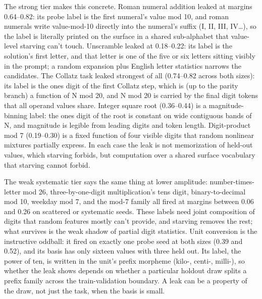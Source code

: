 The strong tier makes this concrete. Roman numeral addition leaked at
margins 0.64--0.82: its probe label is the first numeral's value mod 10,
and roman numerals write value-mod-10 directly into the numeral's suffix
(I, II, III, IV\ldots), so the label is literally printed on the surface in
a shared sub-alphabet that value-level starving can't touch. Unscramble
leaked at 0.18--0.22: its label is the solution's first letter, and that
letter is one of the five or six letters sitting visibly in the prompt;
a random expansion plus English letter statistics narrows the candidates.
The Collatz task leaked strongest of all (0.74--0.82 across both sizes):
its label is the ones digit of the first Collatz step, which is (up to
the parity branch) a function of N mod 20, and N mod 20 is carried by
the final digit tokens that all operand values share. Integer square
root (0.36--0.44) is a magnitude-binning label: the ones digit of the
root is constant on wide contiguous bands of N, and magnitude is legible
from leading digits and token length. Digit-product mod 7 (0.19--0.30) is
a fixed function of four visible digits that random nonlinear mixtures
partially express. In each case the leak is not memorization of held-out
values, which starving forbids, but computation over a shared surface
vocabulary that starving cannot forbid.

The weak systematic tier says the same thing at lower amplitude:
number-times-letter mod 26, three-by-one-digit multiplication's tens
digit, binary-to-decimal mod 10, weekday mod 7, and the mod-7 family all
fired at margins between 0.06 and 0.26 on scattered or systematic seeds.
These labels need joint composition of digits that random features
mostly can't provide, and starving removes the rest; what survives is
the weak shadow of partial digit statistics. Unit conversion is the
instructive oddball: it fired on exactly one probe seed at both sizes
(0.39 and 0.52), and its basis has only sixteen values with three held
out. Its label, the power of ten, is written in the unit's prefix
morpheme (kilo-, centi-, milli-), so whether the leak shows depends on
whether a particular holdout draw splits a prefix family across the
train-validation boundary. A leak can be a property of the draw, not
just the task, when the basis is small.

